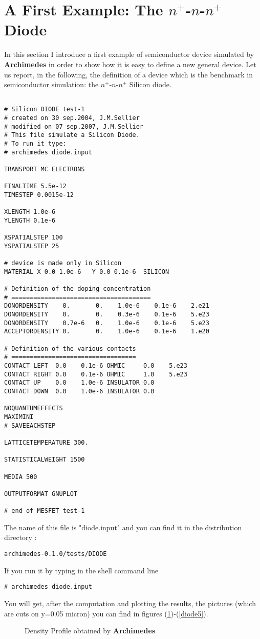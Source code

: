 \documentclass[12pt]{book}
\begin{document}
\section{A First Example: The $n^+$-$n$-$n^+$ Diode}

In this section I introduce a first example of semiconductor device simulated by \textbf{Archimedes} in order to show how it is easy to define a new general device. Let us report, in the following, the definition of a device which is the benchmark in semiconductor simulation: the $n^+$-$n$-$n^+$ Silicon diode.

\begin{verbatim}

# Silicon DIODE test-1
# created on 30 sep.2004, J.M.Sellier
# modified on 07 sep.2007, J.M.Sellier
# This file simulate a Silicon Diode.
# To run it type:
# archimedes diode.input

TRANSPORT MC ELECTRONS

FINALTIME 5.5e-12
TIMESTEP 0.0015e-12

XLENGTH 1.0e-6
YLENGTH 0.1e-6

XSPATIALSTEP 100
YSPATIALSTEP 25

# device is made only in Silicon
MATERIAL X 0.0 1.0e-6   Y 0.0 0.1e-6  SILICON

# Definition of the doping concentration
# ======================================
DONORDENSITY    0.       0.    1.0e-6    0.1e-6    2.e21
DONORDENSITY    0.       0.    0.3e-6    0.1e-6    5.e23
DONORDENSITY    0.7e-6   0.    1.0e-6    0.1e-6    5.e23
ACCEPTORDENSITY 0.       0.    1.0e-6    0.1e-6    1.e20

# Definition of the various contacts
# ==================================
CONTACT LEFT  0.0    0.1e-6 OHMIC     0.0    5.e23
CONTACT RIGHT 0.0    0.1e-6 OHMIC     1.0    5.e23
CONTACT UP    0.0    1.0e-6 INSULATOR 0.0
CONTACT DOWN  0.0    1.0e-6 INSULATOR 0.0

NOQUANTUMEFFECTS
MAXIMINI
# SAVEEACHSTEP

LATTICETEMPERATURE 300.

STATISTICALWEIGHT 1500

MEDIA 500

OUTPUTFORMAT GNUPLOT

# end of MESFET test-1

\end{verbatim}

The name of this file is "diode.input" and you can find it in the distribution directory :
\begin{verbatim}
archimedes-0.1.0/tests/DIODE
\end{verbatim}
If you run it by typing in the shell command line
\begin{verbatim}
# archimedes diode.input
\end{verbatim}
You will get, after the computation and plotting the results, the pictures (which are cuts on y=0.05 micron) you can find in figures (\ref{diode1})-(\ref{diode5}).
\begin{figure}[htb!]
\centerline{} 
\caption{\small Density Profile obtained by \textbf{Archimedes}}
\label{diode1}
\end{figure}
\end{document}
